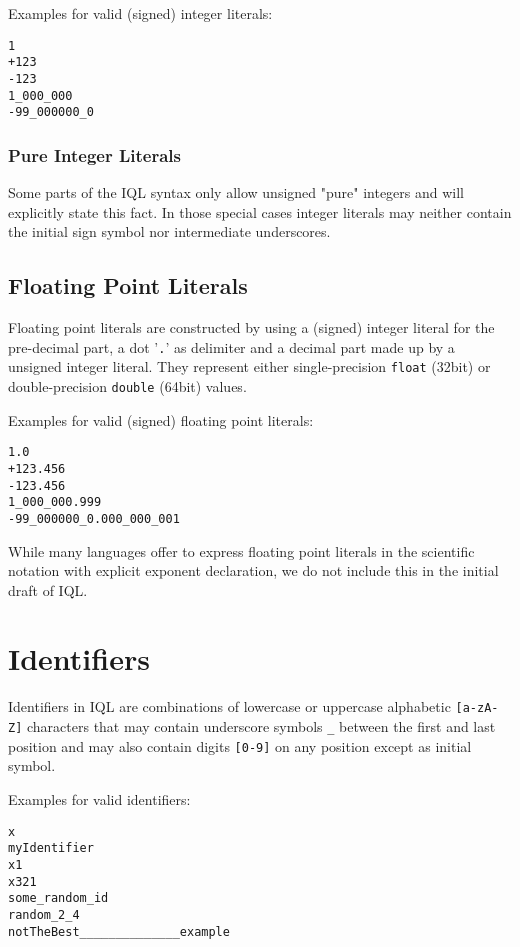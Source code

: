 \documentclass[11pt]{article}
\begin{document}
Examples for valid (signed) integer literals:

\begin{verbatim}
1
+123
-123
1_000_000
-99_000000_0
\end{verbatim}

\subsubsection{Pure Integer Literals}
Some parts of the IQL syntax only allow unsigned "pure" integers and will explicitly state this fact. In those special cases integer literals may neither contain the initial sign symbol nor intermediate underscores.

\subsection{Floating Point Literals}
\label{sec:floating-point-literals}

Floating point literals are constructed by using a (signed) integer literal for the pre-decimal part, a dot '\texttt{.}' as delimiter and a decimal part made up by a unsigned integer literal. They represent either single-precision \texttt{float} (32bit) or double-precision \texttt{double} (64bit) values.

Examples for valid (signed) floating point literals:

\begin{verbatim}
1.0
+123.456
-123.456
1_000_000.999
-99_000000_0.000_000_001
\end{verbatim}

While many languages offer to express floating point literals in the scientific notation with explicit exponent declaration, we do not include this in the initial draft of IQL.

\section{Identifiers}
\label{sec:identifiers}

Identifiers in IQL are combinations of lowercase or uppercase alphabetic \texttt{[a-zA-Z]} characters that may contain underscore symbols \texttt{\_} between the first and last position and may also contain digits \texttt{[0-9]} on any position except as initial symbol.

Examples for valid identifiers:

\begin{verbatim}
x
myIdentifier
x1
x321
some_random_id
random_2_4
notTheBest______________example
\end{verbatim}
\end{document}
